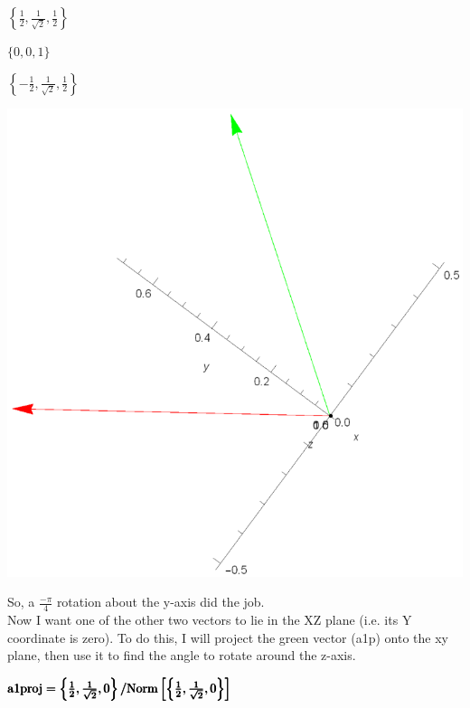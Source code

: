 \documentclass{article}
\begin{document}
\begin{doublespace}
\noindent\(\left\{\frac{1}{2},\frac{1}{\sqrt{2}},\frac{1}{2}\right\}\)
\end{doublespace}

\begin{doublespace}
\noindent\(\{0,0,1\}\)
\end{doublespace}

\begin{doublespace}
\noindent\(\left\{-\frac{1}{2},\frac{1}{\sqrt{2}},\frac{1}{2}\right\}\)
\end{doublespace}

\includegraphics{3D_tiling_gr2.eps}

So, a \(\frac{-\pi }{4}\) rotation about the y-axis did the job.\\
Now I want one of the other two vectors to lie in the XZ plane (i.e. its Y coordinate is zero). To do this, I will project the green vector (a1p)
onto the xy plane, then use it to find the angle to rotate around the z-axis.

\begin{doublespace}
\noindent\(\pmb{\text{}}\\
\pmb{\text{a1proj}=\left\{\frac{1}{2},\frac{1}{\sqrt{2}},0\right\}/\text{Norm}\left[\left\{\frac{1}{2},\frac{1}{\sqrt{2}},0\right\}\right]}\)
\end{doublespace}
\end{document}
